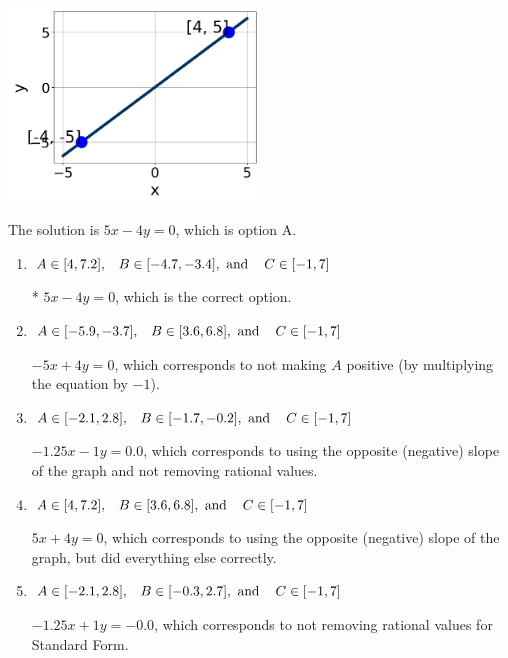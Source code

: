\documentclass{extbook}[14pt]
\begin{document}
\begin{enumerate}
{\begin{center}
    \includegraphics[width=0.5\textwidth]{../Figures/linearGraphToStandardB.png}
\end{center}


The solution is \( 5x - 4y = 0 \), which is option A.\begin{enumerate}[label=\Alph*.]
\item \( A \in [4, 7.2], \hspace{3mm} B \in [-4.7, -3.4], \text{ and } \hspace{3mm} C \in [-1, 7] \)

* $5x - 4y = 0$, which is the correct option.
\item \( A \in [-5.9, -3.7], \hspace{3mm} B \in [3.6, 6.8], \text{ and } \hspace{3mm} C \in [-1, 7] \)

 $-5x + 4y = 0$, which corresponds to not making $A$ positive (by multiplying the equation by $-1$).
\item \( A \in [-2.1, 2.8], \hspace{3mm} B \in [-1.7, -0.2], \text{ and } \hspace{3mm} C \in [-1, 7] \)

 $-1.25x - 1y = 0.0$, which corresponds to using the opposite (negative) slope of the graph and not removing rational values.
\item \( A \in [4, 7.2], \hspace{3mm} B \in [3.6, 6.8], \text{ and } \hspace{3mm} C \in [-1, 7] \)

 $5x + 4y = 0$, which corresponds to using the opposite (negative) slope of the graph, but did everything else correctly.
\item \( A \in [-2.1, 2.8], \hspace{3mm} B \in [-0.3, 2.7], \text{ and } \hspace{3mm} C \in [-1, 7] \)

 $-1.25x + 1y = -0.0$, which corresponds to not removing rational values for Standard Form.
\end{enumerate}

}
\end{enumerate}
\end{document}
